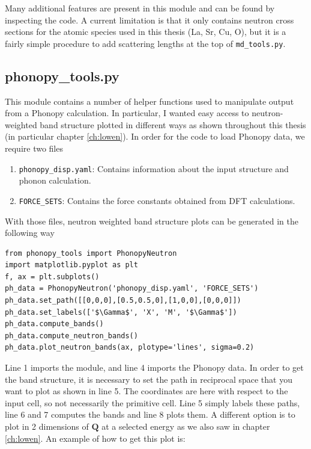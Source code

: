 \noindent Many additional features are present in this module and can be found by inspecting the code. A current limitation is that it only contains neutron cross sections for the atomic species used in this thesis (La, Sr, Cu, O), but it is a fairly simple procedure to add scattering lengths at the top of \texttt{md\_tools.py}.

\subsection{phonopy\_tools.py}
This module contains a number of helper functions used to manipulate output from a Phonopy \cite{Togo2015, phonopywebsite} calculation. In particular, I wanted easy access to neutron-weighted band structure plotted in different ways as shown throughout this thesis (in particular chapter \ref{ch:lowen}). In order for the code to load Phonopy data, we require two files

\begin{enumerate}
    \item \texttt{phonopy\_disp.yaml}: Contains information about the input structure and phonon calculation.
    \item \texttt{FORCE\_SETS}: Contains the force constants obtained from DFT calculations.
\end{enumerate}

\noindent With those files, neutron weighted band structure plots can be generated in the following way

\vspace{1em}
\begin{lstlisting}
from phonopy_tools import PhonopyNeutron
import matplotlib.pyplot as plt
f, ax = plt.subplots()
ph_data = PhonopyNeutron('phonopy_disp.yaml', 'FORCE_SETS')
ph_data.set_path([[0,0,0],[0.5,0.5,0],[1,0,0],[0,0,0]])
ph_data.set_labels(['$\Gamma$', 'X', 'M', '$\Gamma$'])
ph_data.compute_bands()
ph_data.compute_neutron_bands()
ph_data.plot_neutron_bands(ax, plotype='lines', sigma=0.2)
\end{lstlisting}
\vspace{1em}

\noindent Line 1 imports the module, and line 4 imports the Phonopy data. In order to get the band structure, it is necessary to set the path in reciprocal space that you want to plot as shown in line 5. The coordinates are here with respect to the input cell, so not necessarily the primitive cell. Line 5 simply labels these paths, line 6 and 7 computes the bands and line 8 plots them. A different option is to plot in 2 dimensions of $\bm{Q}$ at a selected energy as we also saw in chapter \ref{ch:lowen}. An example of how to get this plot is:

